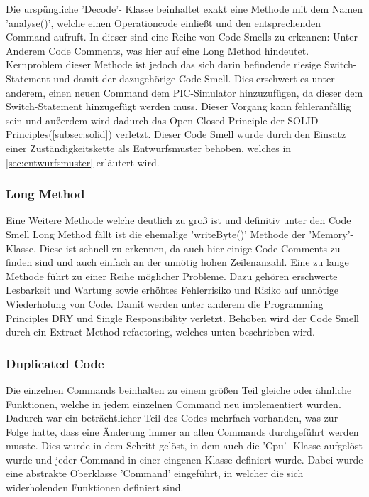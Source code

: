 \documentclass[12pt,a4paper,titlepage,ngerman,pdftex]{report}
\begin{document}
    Die urspüngliche 'Decode'- Klasse beinhaltet exakt eine Methode mit dem Namen 'analyse()', welche einen Operationcode einließt und den entsprechenden Command aufruft. In dieser sind eine Reihe von Code Smells zu erkennen: Unter Anderem Code Comments, was hier auf eine Long Method hindeutet.
    Kernproblem dieser Methode ist jedoch das sich darin befindende riesige Switch-Statement und damit der dazugehörige Code Smell. Dies erschwert es unter anderem, einen neuen Command dem PIC-Simulator hinzuzufügen,
    da dieser dem Switch-Statement hinzugefügt werden muss. Dieser Vorgang kann fehleranfällig sein und außerdem wird dadurch das Open-Closed-Principle der SOLID Principles(\autoref{subsec:solid}) verletzt. 
    Dieser Code Smell wurde durch den Einsatz einer Zuständigkeitskette als Entwurfsmuster behoben, welches in \autoref{sec:entwurfsmuster} erläutert wird.

    \subsubsection{Long Method}

    Eine Weitere Methode welche deutlich zu groß ist und definitiv unter den Code Smell Long Method fällt ist die ehemalige 'writeByte()' Methode der 'Memory'- Klasse. Diese ist schnell zu erkennen, da auch hier einige Code Comments zu finden sind und auch einfach an der unnötig hohen Zeilenanzahl.
    Eine zu lange Methode führt zu einer Reihe möglicher Probleme. Dazu gehören erschwerte Lesbarkeit und Wartung sowie erhöhtes Fehlerrisiko und Risiko auf unnötige Wiederholung von Code. Damit werden unter anderem die Programming Principles DRY und Single Responsibility verletzt. 
    Behoben wird der Code Smell durch ein Extract Method refactoring, welches unten beschrieben wird.
    
    \subsubsection{Duplicated Code}\label{subsubsec:duplicated_code}

    Die einzelnen Commands beinhalten zu einem größen Teil gleiche oder ähnliche Funktionen, welche in jedem einzelnen Command neu implementiert wurden. Dadurch war ein beträchtlicher Teil des Codes mehrfach vorhanden, was zur Folge hatte,
    dass eine Änderung immer an allen Commands durchgeführt werden musste. Dies wurde in dem Schritt gelöst, in dem auch die 'Cpu'- Klasse aufgelöst wurde und jeder Command in einer eingenen Klasse definiert wurde. 
    Dabei wurde eine abstrakte Oberklasse 'Command' eingeführt, in welcher die sich widerholenden Funktionen definiert sind.
\end{document}
